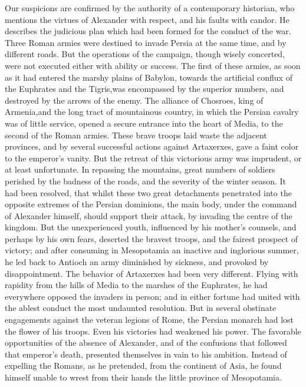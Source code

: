 
Our suspicions are confirmed by the authority of a contemporary
historian, who mentions the virtues of Alexander with respect,
and his faults with candor. He describes the judicious plan which
had been formed for the conduct of the war. Three Roman armies
were destined to invade Persia at the same time, and by different
roads. But the operations of the campaign, though wisely
concerted, were not executed either with ability or success. The
first of these armies, as soon as it had entered the marshy
plains of Babylon, towards the artificial conflux of the
Euphrates and the Tigris,\footnotemark[51] was encompassed by the superior
numbers, and destroyed by the arrows of the enemy. The alliance
of Chosroes, king of Armenia,\footnotemark[52] and the long tract of
mountainous country, in which the Persian cavalry was of little
service, opened a secure entrance into the heart of Media, to the
second of the Roman armies. These brave troops laid waste the
adjacent provinces, and by several successful actions against
Artaxerxes, gave a faint color to the emperor’s vanity. But the
retreat of this victorious army was imprudent, or at least
unfortunate. In repassing the mountains, great numbers of
soldiers perished by the badness of the roads, and the severity
of the winter season. It had been resolved, that whilst these two
great detachments penetrated into the opposite extremes of the
Persian dominions, the main body, under the command of Alexander
himself, should support their attack, by invading the centre of
the kingdom. But the unexperienced youth, influenced by his
mother’s counsels, and perhaps by his own fears, deserted the
bravest troops, and the fairest prospect of victory; and after
consuming in Mesopotamia an inactive and inglorious summer, he
led back to Antioch an army diminished by sickness, and provoked
by disappointment. The behavior of Artaxerxes had been very
different. Flying with rapidity from the hills of Media to the
marshes of the Euphrates, he had everywhere opposed the invaders
in person; and in either fortune had united with the ablest
conduct the most undaunted resolution. But in several obstinate
engagements against the veteran legions of Rome, the Persian
monarch had lost the flower of his troops. Even his victories had
weakened his power. The favorable opportunities of the absence of
Alexander, and of the confusions that followed that emperor’s
death, presented themselves in vain to his ambition. Instead of
expelling the Romans, as he pretended, from the continent of
Asia, he found himself unable to wrest from their hands the
little province of Mesopotamia.\footnotemark[53]

